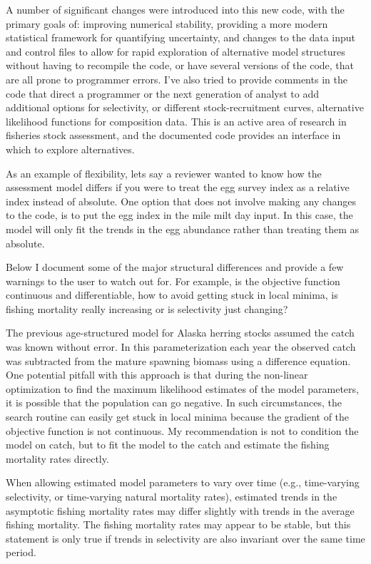 \documentclass[12pt,letterpaper]{article}
\begin{document}
  A number of significant changes were introduced into this new code, with the primary goals of: improving numerical stability, providing a more modern statistical framework for  quantifying uncertainty, and changes to the data input and control files to allow for rapid exploration of alternative model structures without having to recompile the code, or have several versions of the code, that are all prone to programmer errors.  I've also tried to provide comments in the code that direct a programmer or the next generation of analyst to add additional options for selectivity, or different stock-recruitment curves, alternative likelihood functions for composition data.  This is an active area of research in fisheries stock assessment, and the documented code provides an interface in which to explore alternatives.

  As an example of flexibility, lets say a reviewer wanted to know how the assessment model differs if you were to treat the egg survey index as a relative index instead of absolute. One option that does not involve making any changes to the code, is to put the egg index in the mile milt day input.  In this case, the model will only fit the trends in the egg abundance rather than treating them as absolute.

  Below I document some of the major structural differences and provide a few warnings to the user to watch out for.  For example, is the objective function continuous and differentiable, how to avoid getting stuck in local minima, is fishing mortality really increasing or is selectivity just changing?

  The previous age-structured model for Alaska herring stocks assumed the catch was known without error.  In this parameterization each year the observed catch was subtracted from the mature spawning biomass using a difference equation. One potential pitfall with this approach is that during the non-linear optimization to find the maximum likelihood estimates of the model parameters, it is possible that the population can go negative.  In such circumstances, the search routine can easily get stuck in local minima because the gradient of the objective function is not continuous.  My recommendation is not to condition the model on catch, but to fit the model to the catch and estimate the fishing mortality rates directly.


  When allowing estimated model parameters to vary over time (e.g., time-varying selectivity, or time-varying natural mortality rates), estimated trends in the asymptotic fishing mortality rates may differ slightly with trends in the average fishing mortality.  The fishing mortality rates may appear to be stable, but this statement is only true if trends in selectivity are also invariant over the same time period. 

  \label{sec:summary}
  



  
  
\end{document}
